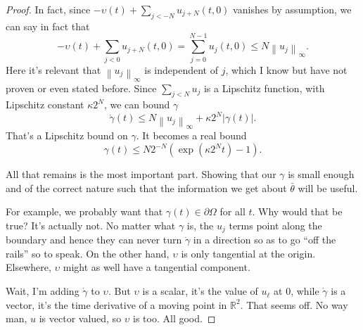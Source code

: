 \documentclass[11pt]{amsart}
\theoremstyle{remark}
\newcommand{\R}{\mathbb{R}}
\newcommand{\norm}[1]{\left\lVert#1\right\rVert}
\newcommand{\del}{\partial}
\begin{document}
\begin{proof}
In fact, since $-\upsilon(t) + \sum_{j<-N} u_{j+N}(t,0)$ vanishes by assumption, we can say in fact that 
\[ -\upsilon(t) +  \sum_{j<0} u_{j+N}(t, 0) = \sum_{j=0}^{N-1} u_j(t,0) \leq N \norm{u_j}_\infty. \]
Here it's relevant that $\norm{u_j}_\infty$ is independent of $j$, which I know but have not proven or even stated before.  Since $\sum_{j<N} u_j$ is a Lipschitz function, with Lipschitz constant $\kappa 2^N$, we can bound $\gamma$
\[ \dot{\gamma}(t) \leq N \norm{u_j}_\infty + \kappa 2^N |\gamma(t)|. \]
That's a Lipschitz bound on $\gamma$.  It becomes a real bound
\[ \gamma(t) \leq N 2^{-N} (\exp(\kappa 2^N t)-1). \]

All that remains is the most important part.  Showing that our $\gamma$ is small enough and of the correct nature such that the information we get about $\bar{\theta}$ will be useful.  

For example, we probably want that $\gamma(t) \in \del \Omega$ for all $t$.  Why would that be true?  It's actually not.  No matter what $\gamma$ is, the $u_j$ terms point along the boundary and hence they can never turn $\dot{\gamma}$ in a direction so as to go ``off the rails'' so to speak.  On the other hand, $\upsilon$ is only tangential at the origin.  Elsewhere, $\upsilon$ might as well have a tangential component.  

Wait, I'm adding $\dot{\gamma}$ to $\upsilon$.  But $\upsilon$ is a scalar, it's the value of $u_\ell$ at 0, while $\dot{\gamma}$ is a vector, it's the time derivative of a moving point in $\R^2$.  That seems off.  No way man, $u$ is vector valued, so $\upsilon$ is too.  All good.  


\end{proof}
\end{document}
